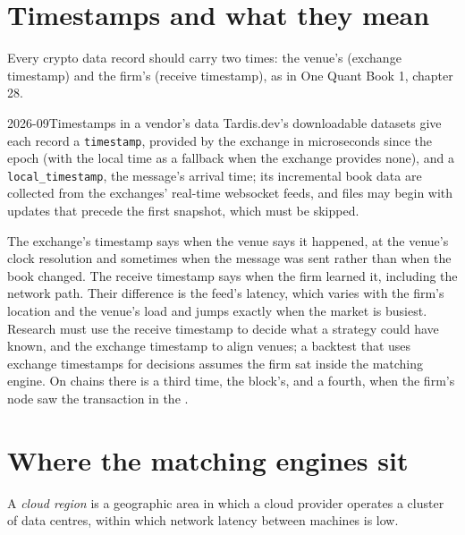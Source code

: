 \section{Timestamps and what they mean}

Every crypto data record should carry two times: the venue's (exchange timestamp) and the firm's (receive timestamp), as in One Quant Book 1, chapter 28.

\begin{dated}{2026-09}{Timestamps in a vendor's data}\label{dat:m3:crypto-data-and-infrastructure:tardis}
Tardis.dev's downloadable datasets give each record a \texttt{timestamp}, provided by the exchange in microseconds since the epoch (with the local time as a
fallback when the exchange provides none), and a \texttt{local\_timestamp}, the message's arrival time; its incremental book data are collected from the
exchanges' real-time websocket feeds, and files may begin with updates that precede the first snapshot, which must be skipped.
\end{dated}

The exchange's timestamp says when the venue says it happened, at the venue's clock resolution and sometimes when the message was sent rather than when the
book changed. The receive timestamp says when the firm learned it, including the network path. Their difference is the feed's latency, which varies with the
firm's location and the venue's load and jumps exactly when the market is busiest. Research must use the receive timestamp to decide what a strategy could have
known, and the exchange timestamp to align venues; a backtest that uses exchange timestamps for decisions assumes the firm sat inside the matching engine. On
chains there is a third time, the block's, and a fourth, when the firm's node saw the transaction in the .

\section{Where the matching engines sit}

\begin{definition}\label{def:m3:crypto-data-and-infrastructure:region}
A \emph{cloud region} is a geographic area in which a cloud provider operates a cluster of data centres, within which network latency between
machines is low.
\end{definition}

